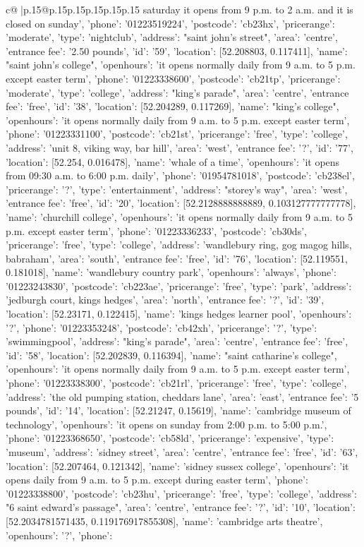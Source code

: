 \documentclass{article}
\begin{document}
{\begin{supertabular}{c@{$\;$}|p{.15\linewidth}@{}p{.15\linewidth}p{.15\linewidth}p{.15\linewidth}p{.15\linewidth}p{.15\linewidth}}
{{{saturday it opens from 9 p.m. to 2 a.m. and it is closed on sunday', 'phone': '01223519224', 'postcode': 'cb23hx', 'pricerange': 'moderate', 'type': 'nightclub'}, {'address': "saint john's street", 'area': 'centre', 'entrance fee': '2.50 pounds', 'id': '59', 'location': [52.208803, 0.117411], 'name': "saint john's college", 'openhours': 'it opens normally daily from 9 a.m. to 5 p.m. except easter term', 'phone': '01223338600', 'postcode': 'cb21tp', 'pricerange': 'moderate', 'type': 'college'}, {'address': "king's parade", 'area': 'centre', 'entrance fee': 'free', 'id': '38', 'location': [52.204289, 0.117269], 'name': "king's college", 'openhours': 'it opens normally daily from 9 a.m. to 5 p.m. except easter term', 'phone': '01223331100', 'postcode': 'cb21st', 'pricerange': 'free', 'type': 'college'}, {'address': 'unit 8, viking way, bar hill', 'area': 'west', 'entrance fee': '?', 'id': '77', 'location': [52.254, 0.016478], 'name': 'whale of a time', 'openhours': 'it opens from 09:30 a.m. to 6:00 p.m. daily', 'phone': '01954781018', 'postcode': 'cb238el', 'pricerange': '?', 'type': 'entertainment'}, {'address': "storey's way", 'area': 'west', 'entrance fee': 'free', 'id': '20', 'location': [52.2128888888889, 0.103127777777778], 'name': 'churchill college', 'openhours': 'it opens normally daily from 9 a.m. to 5 p.m. except easter term', 'phone': '01223336233', 'postcode': 'cb30ds', 'pricerange': 'free', 'type': 'college'}, {'address': 'wandlebury ring, gog magog hills, babraham', 'area': 'south', 'entrance fee': 'free', 'id': '76', 'location': [52.119551, 0.181018], 'name': 'wandlebury country park', 'openhours': 'always', 'phone': '01223243830', 'postcode': 'cb223ae', 'pricerange': 'free', 'type': 'park'}, {'address': 'jedburgh court, kings hedges', 'area': 'north', 'entrance fee': '?', 'id': '39', 'location': [52.23171, 0.122415], 'name': 'kings hedges learner pool', 'openhours': '?', 'phone': '01223353248', 'postcode': 'cb42xh', 'pricerange': '?', 'type': 'swimmingpool'}, {'address': "king's parade", 'area': 'centre', 'entrance fee': 'free', 'id': '58', 'location': [52.202839, 0.116394], 'name': "saint catharine's college", 'openhours': 'it opens normally daily from 9 a.m. to 5 p.m. except easter term', 'phone': '01223338300', 'postcode': 'cb21rl', 'pricerange': 'free', 'type': 'college'}, {'address': 'the old pumping station, cheddars lane', 'area': 'east', 'entrance fee': '5 pounds', 'id': '14', 'location': [52.21247, 0.15619], 'name': 'cambridge museum of technology', 'openhours': 'it opens on sunday from 2:00 p.m. to 5:00 p.m.', 'phone': '01223368650', 'postcode': 'cb58ld', 'pricerange': 'expensive', 'type': 'museum'}, {'address': 'sidney street', 'area': 'centre', 'entrance fee': 'free', 'id': '63', 'location': [52.207464, 0.121342], 'name': 'sidney sussex college', 'openhours': 'it opens daily from 9 a.m. to 5 p.m. except during easter term', 'phone': '01223338800', 'postcode': 'cb23hu', 'pricerange': 'free', 'type': 'college'}, {'address': "6 saint edward's passage", 'area': 'centre', 'entrance fee': '?', 'id': '10', 'location': [52.2034781571435, 0.119176917855308], 'name': 'cambridge arts theatre', 'openhours': '?', 'phone': }}}
\end{supertabular}}
\end{document}
